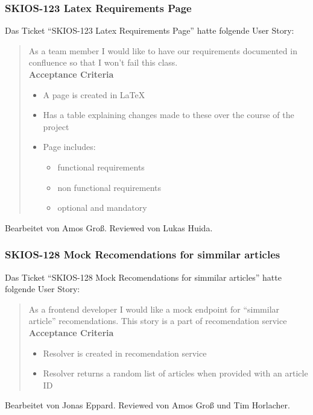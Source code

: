\subsubsection{SKIOS-123 Latex Requirements Page}
Das Ticket \enquote{SKIOS-123 Latex Requirements Page} hatte folgende User Story:
\begin{quotation}
    As a team member I would like to have our requirements documented in confluence so that I won't fail this class. \\
\textbf{Acceptance Criteria}
\begin{itemize}
    \item A page is created in LaTeX
    \item Has a table explaining changes made to these over the course of the project
    \item Page includes:
    \begin{itemize}
    \item functional requirements
    \item non functional requirements 
    \item optional and mandatory
    \end{itemize}
\end{itemize}
\end{quotation}
Bearbeitet von Amos Groß.
Reviewed von Lukas Huida.

\subsubsection{SKIOS-128 Mock Recomendations for simmilar articles}
Das Ticket \enquote{SKIOS-128 Mock Recomendations for simmilar articles} hatte folgende User Story:
\begin{quotation}
    As a frontend developer I would like a mock endpoint for “simmilar article” recomendations.
This story is a part of recomendation service
\textbf{Acceptance Criteria}
\begin{itemize}
    \item Resolver is created in recomendation service
    \item Resolver returns a random list of articles when provided with an article ID
\end{itemize}
\end{quotation}
Bearbeitet von Jonas Eppard.
Reviewed von Amos Groß und Tim Horlacher.

